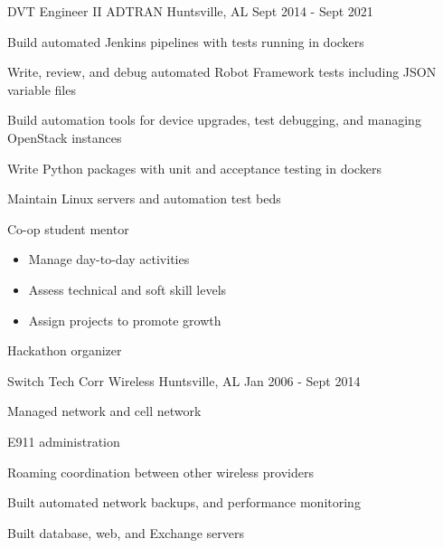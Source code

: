 \begin{cventries}
  \cventry
    {DVT Engineer II} %
    {ADTRAN} %
    {Huntsville, AL} %
    {Sept 2014 - Sept 2021} %
    {
      \begin{cvitems} %
        \item {Build automated Jenkins pipelines with tests running in dockers}
        \item {Write, review, and debug automated Robot Framework tests including JSON variable files}
        \item {Build automation tools for device upgrades, test debugging, and managing OpenStack instances}
        \item {Write Python packages with unit and acceptance testing in dockers}
        \item {Maintain Linux servers and automation test beds}
        \item {Co-op student mentor}
            \begin{itemize}
                \item {Manage day-to-day activities}
                \item {Assess technical and soft skill levels}
                \item {Assign projects to promote growth}
            \end{itemize}
        \item {Hackathon organizer}
      \end{cvitems}
    }

  \cventry
    {Switch Tech} %
    {Corr Wireless} %
    {Huntsville, AL} %
    {Jan 2006 - Sept 2014} %
    {
      \begin{cvitems} %
        \item {Managed network and cell network}
        \item {E911 administration}
        \item {Roaming coordination between other wireless providers}
        \item {Built automated network backups, and performance monitoring}
        \item {Built database, web, and Exchange servers}
      \end{cvitems}
    }

\end{cventries}
